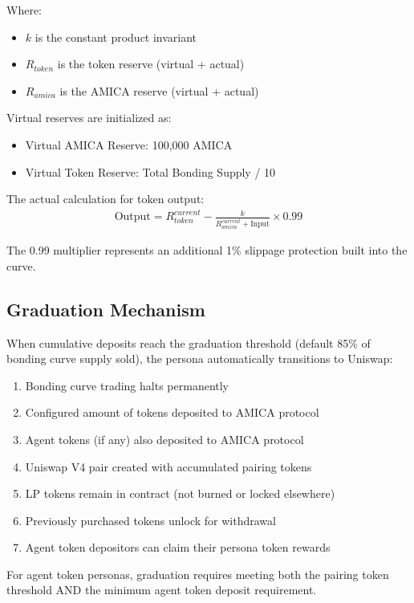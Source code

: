 \documentclass{article}
\begin{document}
Where:
\begin{itemize}
    \item $k$ is the constant product invariant
    \item $R_{token}$ is the token reserve (virtual + actual)
    \item $R_{amica}$ is the AMICA reserve (virtual + actual)
\end{itemize}

Virtual reserves are initialized as:
\begin{itemize}
    \item Virtual AMICA Reserve: 100,000 AMICA
    \item Virtual Token Reserve: Total Bonding Supply / 10
\end{itemize}

The actual calculation for token output:
\begin{align}
\text{Output} = R_{token}^{current} - \frac{k}{R_{amica}^{current} + \text{Input}} \times 0.99
\end{align}

The 0.99 multiplier represents an additional 1\% slippage protection built into the curve.

\subsection{Graduation Mechanism}

When cumulative deposits reach the graduation threshold (default 85\% of bonding curve supply sold), the persona automatically transitions to Uniswap:

\begin{enumerate}
    \item Bonding curve trading halts permanently
    \item Configured amount of tokens deposited to AMICA protocol
    \item Agent tokens (if any) also deposited to AMICA protocol
    \item Uniswap V4 pair created with accumulated pairing tokens
    \item LP tokens remain in contract (not burned or locked elsewhere)
    \item Previously purchased tokens unlock for withdrawal
    \item Agent token depositors can claim their persona token rewards
\end{enumerate}

For agent token personas, graduation requires meeting both the pairing token threshold AND the minimum agent token deposit requirement.
\end{document}
